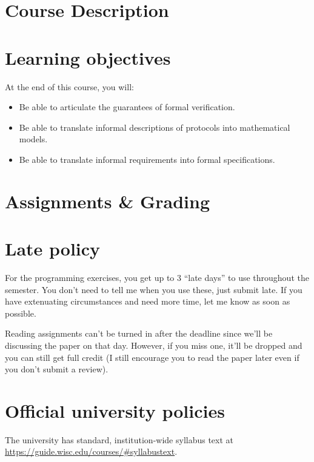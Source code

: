 \maketitle

\section*{Course Description}

\section*{Learning objectives}

At the end of this course, you will:

\begin{itemize}[noitemsep]
  \item Be able to articulate the guarantees of formal verification.
  \item Be able to translate informal descriptions of protocols into mathematical
  models.
  \item Be able to translate informal requirements into formal specifications.
\end{itemize}

\section*{Assignments \& Grading}

\section*{Late policy}

For the programming exercises, you get up to 3 ``late days'' to use throughout
the semester. You don't need to tell me when you use these, just submit late. If
you have extenuating circumstances and need more time, let me know as soon as
possible.

Reading assignments can't be turned in after the deadline since we'll be
discussing the paper on that day. However, if you miss one, it'll be dropped and
you can still get full credit (I still encourage you to read the paper later
even if you don't submit a review).

\section*{Official university policies}

The university has standard, institution-wide syllabus text at
\url{https://guide.wisc.edu/courses/#syllabustext}.
